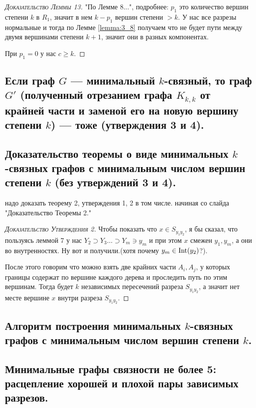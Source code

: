 \begin{proof}[\normalfont\textsc{Доказательство Леммы 13}]
	"По Лемме 8...", подробнее: $p_1$ это количество вершин степени $k$ в  $R_1$, значит в нем $k - p_1$ вершин степени $> k$. У нас все разрезы нормальные и тогда по Лемме \ref{lemma:3_8} получаем что не будет пути между двумя вершинами степени  $k + 1$, значит они в разных компонентах.

	При  $p_1 = 0$ у нас $c \geqslant k$.
\end{proof}
\subsection{Если граф $G$ — минимальный $k$-связный, то граф $G'$ (полученный отрезанием графа $K_{k,k}$ от крайней части и заменой его на новую вершину степени $k$) — тоже (утверждения 3 и 4).}

\subsection{Доказательство теоремы о виде минимальных $k$-связных графов с минимальным числом вершин степени $k$ (без утверждений 3 и 4).}

надо доказать теорему 2, утверждения 1, 2 в том числе. начиная со слайда "Доказательство Теоремы 2."

\begin{proof}[\normalfont\textsc{Доказательство Утверждения 2}]
	Чтобы показать что $x \in S_{y_1y_2}$, я бы сказал, что пользуясь леммой 7 у нас $Y_2 \supset Y_3 \dots \supset Y_m \ni y_m$ и при этом $x$ смежен  $y_1, y_m$, а они во внутренностях. Ну вот и получили.(хотя почему $y_m \in \operatorname{Int}(y_2)$?).

	После этого говорим что можно взять две крайних части  $A_i, A_j$, у которых границы содержат по вершине каждого дерева и проследить путь по этим вершинам. Тогда будет  $k$ независимых пересечений разреза  $S_{y_1 y_2}$, а значит нет месте вершине $x$ внутри разреза  $S_{y_1y_2}$.
\end{proof}

\subsection{Алгоритм построения минимальных $k$-связных графов с минимальным числом вершин степени $k$.}

\subsection{Минимальные графы связности не более 5: расцепление хорошей и плохой пары зависимых разрезов.}

